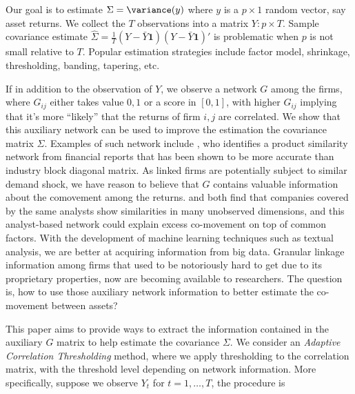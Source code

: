 Our goal is to estimate \(\Sigma =\variance(y)\) where \(y\) is a \(p \times 1\) random vector, say asset returns. We collect the \(T\) observations into a matrix \(Y:p\times T\). Sample covariance estimate \(\hat{\Sigma} = \frac{1}{T} (Y - \bar{Y}\mathbf{1})(Y - \bar{Y}\mathbf{1})'\) is problematic when \(p\) is not small relative to \(T\). Popular estimation strategies include factor model, shrinkage, thresholding, banding, tapering, etc.

If in addition to the observation of \(Y\), we observe a network \(G\) among the firms, where \(G_{ij}\) either takes value \(0,1\) or a score in \([0,1]\), with higher \(G_{ij}\) implying that it's more ``likely'' that the returns of firm \(i,j\) are correlated. We show that this auxiliary network can be used to improve the estimation the covariance matrix \(\Sigma\). Examples of such network include \cite{hoberg2016TextBasedNetwork}, who identifies a product similarity network from financial reports that has been shown to be more accurate than industry block diagonal matrix. As linked firms are potentially subject to similar demand shock, we have reason to believe that \(G\) contains valuable information about the comovement among the returns.
\cite{israelsen2016does} and \cite{kaustia2020CommonAnalysts} both find that companies covered by the same analysts show similarities in many unobserved dimensions, and this analyst-based network could explain excess co-movement on top of common factors. With the development of machine learning techniques such as textual analysis, we are better at acquiring information from big data. Granular linkage information among firms that used to be notoriously hard to get due to its proprietary properties,  now are becoming available to researchers. The question is, how to use those auxiliary network information to  better estimate the co-movement between assets?


This paper aims to provide ways to extract the information contained in the auxiliary \(G\) matrix to help estimate the covariance \(\Sigma\). We consider an \textit{Adaptive Correlation Thresholding} method, where we apply thresholding to the correlation matrix, with the threshold level depending on network information. More specifically, suppose we observe \(Y_{t}\) for \(t = 1 ,\dots, T\), the procedure is 

